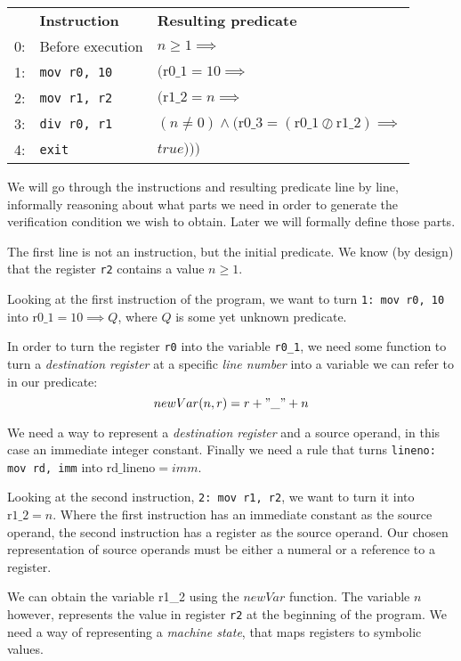\begin{tabular}{rll}
    & \textbf{Instruction} & \textbf{Resulting predicate}  \\
  0:& Before execution & $n \geq 1 \implies$ \\
  1:& \texttt{mov r0, 10} & $(\text{r0\_1} = 10 \implies $ \\
  2:& \texttt{mov r1, r2} & $(\text{r1\_2} = n \implies$  \\
  3:& \texttt{div r0, r1} & $(n \neq 0) \land (\text{r0\_3} = (\text{r0\_1} \oslash \text{r1\_2}) \implies$  \\
  4:& \texttt{exit} & $true)))$ \\
\end{tabular}

We will go through the instructions and resulting predicate line by line, informally reasoning about what parts we need in order to generate the verification condition we wish to obtain. Later we will formally define those parts.

The first line is not an instruction, but the initial predicate. We know (by design) that the register \texttt{r2} contains a value $n \geq 1$. 

Looking at the first instruction of the program, we want to turn \texttt{1: mov r0, 10} into $\text{r0\_1} = 10 \implies Q$, where $Q$ is some yet unknown predicate.

In order to turn the register \texttt{r0} into the variable \texttt{r0\_1}, we need some function to turn a \textit{destination register} at a specific \textit{line number} into a variable we can refer to in our predicate:
\[
newVar (n, r) = r + "\_" + n
\]

We need a way to represent a \textit{destination register} and a source operand, in this case an immediate integer constant.
Finally we need a rule that turns \texttt{lineno: mov rd, imm} into $\text{rd\_lineno} = imm$.

Looking at the second instruction, \texttt{2: mov r1, r2}, we want to turn it into $\text{r1\_2} = n$.
Where the first instruction has an immediate constant as the source operand, the second instruction has a register as the source operand. Our chosen representation of source operands must be either a numeral or a reference to a register.

We can obtain the variable r1\_2 using the $newVar$ function. The variable $n$ however, represents the value in register \texttt{r2} at the beginning of the program. We need a way of representing a \textit{machine state}, that maps registers to symbolic values.

